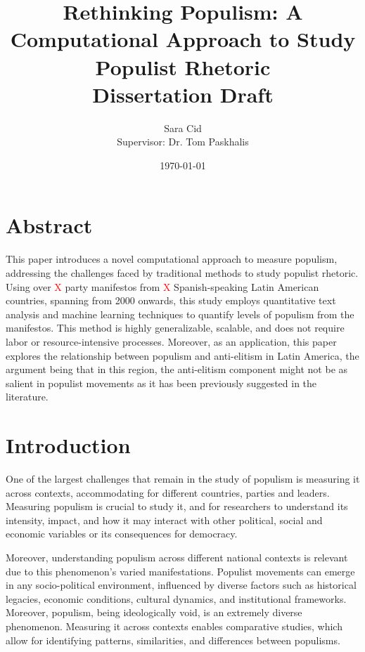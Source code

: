 \documentclass[12pt,letterpaper]{article}
\title{
	Rethinking Populism: A Computational Approach to Study Populist Rhetoric\\
	\large Dissertation Draft  
}
\author{
	Sara Cid\\  
	Supervisor: Dr. Tom Paskhalis  
}
\date{\today}
\begin{document}
	
\maketitle

\section*{Abstract}

\noindent This paper introduces a novel computational approach to measure populism, addressing the challenges faced by traditional methods to study populist rhetoric. Using over \textcolor{red}{X} party manifestos from \textcolor{red}{X} Spanish-speaking Latin American countries, spanning from 2000 onwards, this study employs quantitative text analysis and machine learning techniques to quantify levels of populism from the manifestos. This method is highly generalizable, scalable, and does not require labor or resource-intensive processes. Moreover, as an application, this paper explores the relationship between populism and anti-elitism in Latin America, the argument being that in this region, the anti-elitism component might not be as salient in populist movements as it has been previously suggested in the literature. 
 

\tableofcontents
\listoffigures
\listoftables

\section*{Introduction} 

\vspace{.25cm}
One of the largest challenges that remain in the study of populism is measuring it across contexts, accommodating for different countries, parties and leaders. Measuring populism is crucial to study it, and for researchers to understand its intensity, impact, and how it may interact with other political, social and economic variables or its consequences for democracy. 

Moreover, understanding populism across different national contexts is relevant due to this phenomenon's varied manifestations. Populist movements can emerge in any socio-political environment, influenced by diverse factors such as historical legacies, economic conditions, cultural dynamics, and institutional frameworks. Moreover, populism, being ideologically void, is an extremely diverse phenomenon. Measuring it across contexts enables comparative studies, which allow for identifying patterns, similarities, and differences between populisms. 
\end{document}
